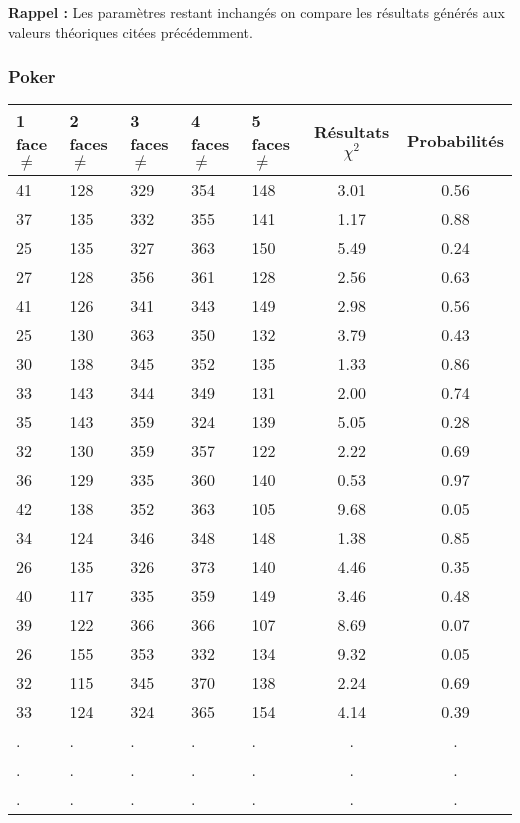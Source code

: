 \documentclass[12pt,a4paper]{article}
\begin{document}
\textbf{Rappel :} Les paramètres restant inchangés on compare les résultats générés aux valeurs théoriques citées précédemment.
\subsubsection{Poker}

\begin{center}
\begin{tabular}{|l|l|l|l|l|c|c|}
\hline
1 face $\neq$ & 2 faces $\neq$  & 3 faces $\neq$ & 4 faces $\neq$ & 5 faces $\neq$ & Résultats $\chi^2$ & Probabilités \\
\hline \hline
41 & 128 & 329 & 354 & 148 &  3.01 &  0.56\\ \hline
37 & 135 & 332 & 355 & 141 &  1.17 &  0.88\\ \hline
25 & 135 & 327 & 363 & 150 &  5.49 &  0.24\\ \hline
27 & 128 & 356 & 361 & 128 &  2.56 &  0.63\\ \hline
41 & 126 & 341 & 343 & 149 &  2.98 &  0.56\\ \hline
25 & 130 & 363 & 350 & 132 &  3.79 &  0.43\\ \hline
30 & 138 & 345 & 352 & 135 &  1.33 &  0.86\\ \hline
33 & 143 & 344 & 349 & 131 &  2.00 &  0.74\\ \hline
35 & 143 & 359 & 324 & 139 &  5.05 &  0.28\\ \hline
32 & 130 & 359 & 357 & 122 &  2.22 &  0.69\\ \hline
36 & 129 & 335 & 360 & 140 &  0.53 &  0.97\\ \hline
42 & 138 & 352 & 363 & 105 &  9.68 &  0.05\\ \hline
34 & 124 & 346 & 348 & 148 &  1.38 &  0.85\\ \hline
26 & 135 & 326 & 373 & 140 &  4.46 &  0.35\\ \hline
40 & 117 & 335 & 359 & 149 &  3.46 &  0.48\\ \hline
39 & 122 & 366 & 366 & 107 &  8.69 &  0.07\\ \hline
26 & 155 & 353 & 332 & 134 &  9.32 &  0.05\\ \hline
32 & 115 & 345 & 370 & 138 &  2.24 &  0.69\\ \hline
33 & 124 & 324 & 365 & 154 &  4.14 &  0.39\\ \hline
 . & . & . & . & . & . & . \\ \hline
 . & . & . & . & . & . & . \\ \hline
 . & . & . & . & . & . & . \\ \hline

\end{tabular}
\end{center}
\end{document}
